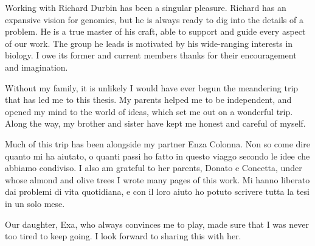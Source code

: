 \documentclass[a4paper,12pt,numbered,oneside]{Classes/PhDThesisPSnPDF}
\begin{document}
\begin{acknowledgements}
  Working with Richard Durbin has been a singular pleasure.
  Richard has an expansive vision for genomics, but he is always ready to dig into the details of a problem.
  He is a true master of his craft, able to support and guide every aspect of our work.
  The group he leads is motivated by his wide-ranging interests in biology.
  I owe its former and current members thanks for their encouragement and imagination.

  Without my family, it is unlikely I would have ever begun the meandering trip that has led me to this thesis.
  My parents helped me to be independent, and opened my mind to the world of ideas, which set me out on a wonderful trip.
  Along the way, my brother and sister have kept me honest and careful of myself.

  Much of this trip has been alongside my partner Enza Colonna.
  Non so come dire quanto mi ha aiutato, o quanti passi ho fatto in questo viaggo secondo le idee che abbiamo condiviso.
  I also am grateful to her parents, Donato e Concetta, under whose almond and olive trees I wrote many pages of this work.
  Mi hanno liberato dai problemi di vita quotidiana, e con il loro aiuto ho potuto scrivere tutta la tesi in un solo mese.

  Our daughter, Exa, who always convinces me to play, made sure that I was never too tired to keep going.
  I look forward to sharing this with her.



\end{acknowledgements}
\end{document}
